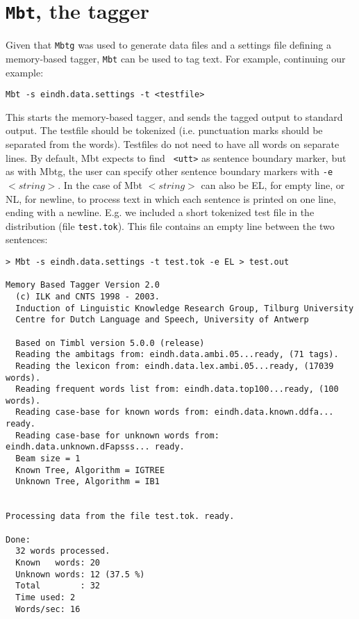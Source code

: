 \documentclass{report}
\begin{document}
\section{{\tt Mbt}, the tagger}

Given that {\tt Mbtg} was used to generate data files and a settings file
defining a memory-based tagger, {\tt Mbt} can be used to tag text. For
example, continuing our example:

{\small
\begin{verbatim}
Mbt -s eindh.data.settings -t <testfile>
\end{verbatim}
}

This starts the memory-based tagger, and sends the tagged output to
standard output. The testfile should be tokenized (i.e. punctuation
marks should be separated from the words). Testfiles do not need to
have all words on separate lines. By default, Mbt expects to find {\tt
<utt>} as sentence boundary marker, but as with Mbtg, the user can
specify other sentence boundary markers with {\tt -e} $<string>$. In
the case of Mbt $<string>$ can also be EL, for empty line, or NL, for
newline, to process text in which each sentence is printed on one
line, ending with a newline. E.g. we included a short tokenized test
file in the distribution (file {\tt test.tok}). This file contains an
empty line between the two sentences:

{\small
\begin{verbatim}
> Mbt -s eindh.data.settings -t test.tok -e EL > test.out

Memory Based Tagger Version 2.0
  (c) ILK and CNTS 1998 - 2003.
  Induction of Linguistic Knowledge Research Group, Tilburg University
  Centre for Dutch Language and Speech, University of Antwerp

  Based on Timbl version 5.0.0 (release)
  Reading the ambitags from: eindh.data.ambi.05...ready, (71 tags).
  Reading the lexicon from: eindh.data.lex.ambi.05...ready, (17039 words).
  Reading frequent words list from: eindh.data.top100...ready, (100 words).
  Reading case-base for known words from: eindh.data.known.ddfa... ready.
  Reading case-base for unknown words from: eindh.data.unknown.dFapsss... ready.
  Beam size = 1
  Known Tree, Algorithm = IGTREE
  Unknown Tree, Algorithm = IB1


Processing data from the file test.tok. ready.

Done:
  32 words processed.
  Known   words: 20
  Unknown words: 12 (37.5 %)
  Total        : 32
  Time used: 2
  Words/sec: 16
\end{verbatim}
}
\end{document}
